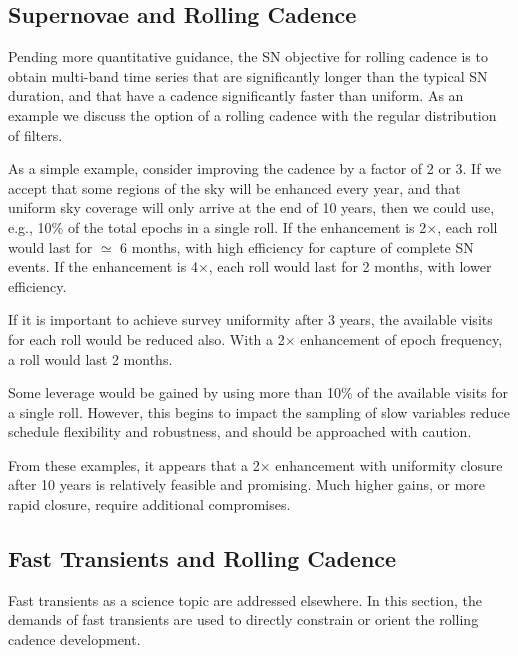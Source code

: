 \subsection{Supernovae and Rolling Cadence}
\label{sec:rolling:supernovae}


Pending more quantitative guidance, the SN objective for rolling cadence
is to obtain multi-band time series that are significantly longer than
the typical SN duration, and that have a cadence significantly faster
than uniform. As an example we discuss the option of a rolling cadence
with the regular distribution of filters.

As a simple example, consider improving the cadence by a factor of 2 or
3.  If we accept that some regions of the sky will be enhanced every
year, and that uniform sky coverage will only arrive at the end of 10
years, then we could use, e.g., 10\% of the total epochs in a single
roll.  If the enhancement is 2$\times$, each roll would last for
$\simeq$ 6 months, with high efficiency for capture of complete SN
events.  If the enhancement is 4$\times$, each roll would last for 2
months, with lower efficiency.

If it is important to achieve survey uniformity after 3 years, the
available visits for each roll would be reduced also.  With a 2$\times$
enhancement of epoch frequency, a roll would last 2 months.

Some leverage would be gained by using more than 10\% of the available
visits for a single roll.  However, this begins to impact the sampling
of slow variables reduce schedule flexibility and robustness, and should
be approached with caution.

From these examples, it appears that a 2$\times$ enhancement with
uniformity closure after 10 years is relatively feasible and promising.
Much higher gains, or more rapid closure, require additional
compromises.


\subsection{Fast Transients and Rolling Cadence}
\label{sec:rolling:transients}

Fast transients as a science topic are addressed elsewhere. In this
section, the demands of fast transients are used to directly constrain
or orient the rolling cadence development.

